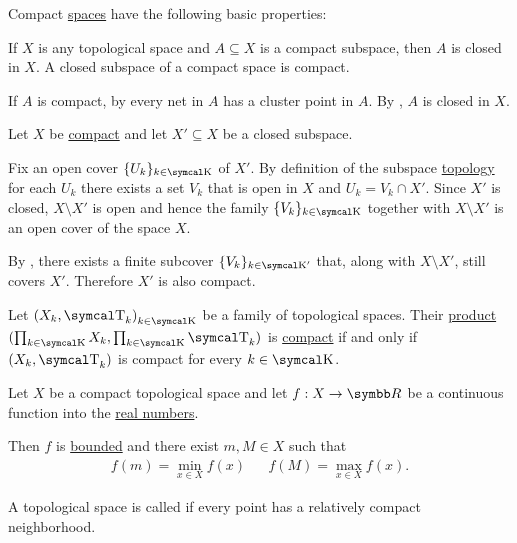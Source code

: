 \begin{Proposition}\label{thm:compact_space_properties}
  Compact \hyperref[def:compact_space]{spaces} have the following basic properties:
  \begin{PropEnum}
     If \( X \) is any topological space and \( A \subseteq X \) is a compact subspace, then \( A \) is closed in \( X \).
     A closed subspace of a compact space is compact.
  \end{PropEnum}
\end{Proposition}
\begin{RefListProof}
     If \( A \) is compact, by  every net in \( A \) has a cluster point in \( A \). By , \( A \) is closed in \( X \).

     Let \( X \) be \hyperref[def:compact_space]{compact} and let \( X' \subseteq X \) be a closed subspace.

    Fix an open cover \( \{ U_k \}_{k \in \CK} \) of \( X' \). By definition of the subspace \hyperref[def:topological_subspace]{topology} for each \( U_k \) there exists a set \( V_k \) that is open in \( X \) and \( U_k = V_k \cap X' \). Since \( X' \) is closed, \( X \setminus X' \) is open and hence the family \( \{ V_k \}_{k \in \CK} \) together with \( X \setminus X' \) is an open cover of the space \( X \).

    By , there exists a finite subcover \( \{ V_k \}_{k \in \CK'} \) that, along with \( X \setminus X' \), still covers \( X' \). Therefore \( X' \) is also compact.
\end{RefListProof}

\begin{Theorem}\label{thm:tychonoffs_product_theorem}\cite[theorem 3.2.4]{Engelking1989}
  Let \( { (X_k, \CT_k) }_{k \in \CK} \) be a family of topological spaces. Their \hyperref[def:topological_product]{product} \( (\prod_{k \in \CK} X_k, \prod_{k \in \CK} \CT_k) \) is \hyperref[def:compact_space]{compact} if and only if \( (X_k, \CT_k) \) is compact for every \( k \in \CK \).
\end{Theorem}

\begin{Theorem}\label{thm:weierstrass_extreme_value_theorem}\cite[corollary 3.2.9]{Engelking1989}
  Let \( X \) be a compact topological space and let \( f: X \to \BR \) be a continuous function into the \hyperref[def:real_numbers]{real numbers}.

  Then \( f \) is \hyperref[def:metric_space/bounded_function]{bounded} and there exist \( m, M \in X \) such that
  \begin{align*}
    f(m) = \min_{x \in X} f(x)
    &&
    f(M) = \max_{x \in X} f(x).
  \end{align*}
\end{Theorem}

\begin{Definition}\label{def:locally_compact_space}\cite[148]{Engelking1989}
  A topological space is called  if every point has a relatively compact neighborhood.
\end{Definition}
